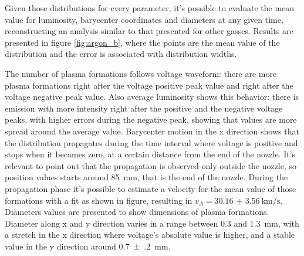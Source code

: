 Given those distributions for every parameter, it's possible to evaluate the mean value for luminosity, barycenter coordinates and diameters at any given time, reconstructing an analysis similar to that presented for other gasses. Results are presented in figure \ref{fig:argon_b}, where the points are the mean value of the distribution and the error is associated with distribution widths.

The number of plasma formations follows voltage waveform: there are more plasma formations right after the voltage positive peak value and right after the voltage negative peak value. Also average luminosity shows this behavior: there is emission with more intensity right after the positive and the negative voltage peaks, with higher errors during the negative peak, showing that values are more spread around the average value.
Barycenter motion in the x direction shows that the distribution propagates during the time interval where voltage is positive and stops when it becames zero, at a certain distance from the end of the nozzle. It's relevant to point out that the propagation is observed only outside the nozzle, so position values starts around \SI{85}{\milli\meter}, that is the end of the nozzle. During the propagation phase it's possible to estimate a velocity for the mean value of those formations with a fit as shown in figure, resulting in $v_A = \SI{30.16(356)}{\kilo\meter/\second}$.
Diameters values are presented to show dimensions of plasma formations. Diameter along x and y direction varies in a range between \num{0.3} and \SI{1.3}{\milli\meter}, with a stretch in the x direction where voltage's absolute value is higher, and a stable value in the y direction around \SI{0.7(2)}{\milli\meter}. 
